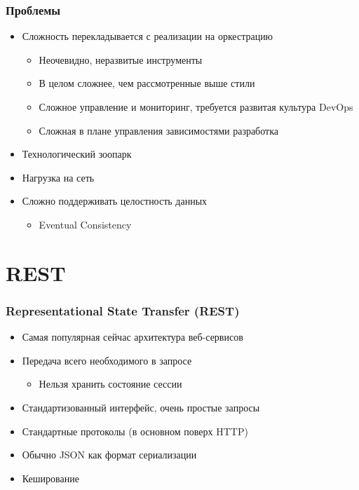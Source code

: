 \documentclass{../cscslides}
\begin{document}
    \begin{frame}
        \frametitle{Проблемы}
        \begin{itemize}
            \item Сложность перекладывается с реализации на оркестрацию
            \begin{itemize}
                \item Неочевидно, неразвитые инструменты
                \item В целом сложнее, чем рассмотренные выше стили
                \item Сложное управление и мониторинг, требуется развитая культура DevOps
                \item Сложная в плане управления зависимостями разработка
            \end{itemize}
            \item Технологический зоопарк
            \item Нагрузка на сеть
            \item Сложно поддерживать целостность данных
            \begin{itemize}
                \item Eventual Consistency
            \end{itemize}
        \end{itemize}
    \end{frame}

    \section{REST}

    \begin{frame}
        \frametitle{Representational State Transfer (REST)}
        \begin{itemize}
            \item Самая популярная сейчас архитектура веб-сервисов
            \item Передача всего необходимого в запросе
            \begin{itemize}
                \item Нельзя хранить состояние сессии
            \end{itemize}
            \item Стандартизованный интерфейс, очень простые запросы
            \item Стандартные протоколы (в основном поверх HTTP)
            \item Обычно JSON как формат сериализации
            \item Кеширование
        \end{itemize}
    \end{frame}
\end{document}
